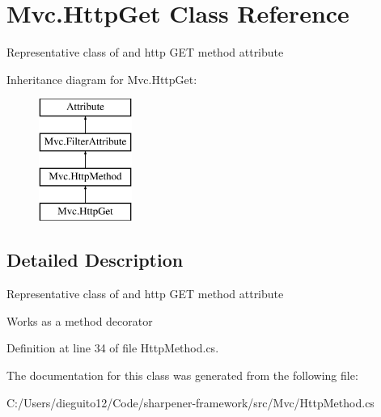\hypertarget{class_mvc_1_1_http_get}{}\section{Mvc.\+Http\+Get Class Reference}
\label{class_mvc_1_1_http_get}


Representative class of and http G\+ET method attribute  


Inheritance diagram for Mvc.\+Http\+Get\+:\begin{figure}[H]
\begin{center}
\leavevmode
\includegraphics[height=4.000000cm]{class_mvc_1_1_http_get}
\end{center}
\end{figure}


\subsection{Detailed Description}
Representative class of and http G\+ET method attribute 

Works as a method decorator

Definition at line 34 of file Http\+Method.\+cs.



The documentation for this class was generated from the following file\+:\begin{DoxyCompactItemize}
\item 
C\+:/\+Users/dieguito12/\+Code/sharpener-\/framework/src/\+Mvc/Http\+Method.\+cs\end{DoxyCompactItemize}
